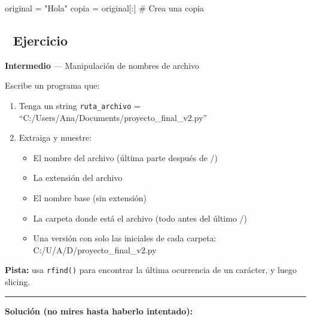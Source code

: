 \documentclass[
  doc,
  floatsintext,
  longtable,
  a4paper,
  nolmodern,
  notxfonts,
  notimes,
  12pt,
  colorlinks=true,linkcolor=blue,citecolor=blue,urlcolor=blue]{apa7}
\newenvironment{Shaded}{\begin{snugshade}}{\end{snugshade}}
\newcommand{\CommentTok}[1]{\textcolor[rgb]{0.37,0.37,0.37}{#1}}
\newcommand{\NormalTok}[1]{\textcolor[rgb]{0.00,0.23,0.31}{#1}}
\newcommand{\OperatorTok}[1]{\textcolor[rgb]{0.37,0.37,0.37}{#1}}
\newcommand{\StringTok}[1]{\textcolor[rgb]{0.13,0.47,0.30}{#1}}
\providecommand{\tightlist}{%
  \setlength{\itemsep}{0pt}\setlength{\parskip}{0pt}}
\begin{document}
\begin{enumerate}
\begin{Shaded}
\begin{Highlighting}[]
\NormalTok{original }\OperatorTok{=} \StringTok{"Hola"}
\NormalTok{copia }\OperatorTok{=}\NormalTok{ original[:]  }\CommentTok{\# Crea una copia}
\end{Highlighting}
\end{Shaded}
\end{enumerate}

\subsection{📝 Ejercicio}\label{ejercicio}

\textbf{Intermedio} --- Manipulación de nombres de archivo

Escribe un programa que:

\begin{enumerate}
\def\labelenumi{\arabic{enumi}.}
\tightlist
\item
  Tenga un string \texttt{ruta\_archivo} =
  ``C:/Users/Ana/Documents/proyecto\_final\_v2.py''
\item
  Extraiga y muestre:

  \begin{itemize}
  \tightlist
  \item
    El nombre del archivo (última parte después de /)
  \item
    La extensión del archivo
  \item
    El nombre base (sin extensión)
  \item
    La carpeta donde está el archivo (todo antes del último /)
  \item
    Una versión con solo las iniciales de cada carpeta:
    C:/U/A/D/proyecto\_final\_v2.py
  \end{itemize}
\end{enumerate}

\textbf{Pista:} usa \texttt{rfind()} para encontrar la última ocurrencia
de un carácter, y luego slicing.

\begin{center}\rule{0.5\linewidth}{0.5pt}\end{center}

\textbf{Solución (no mires hasta haberlo intentado):}
\end{document}
